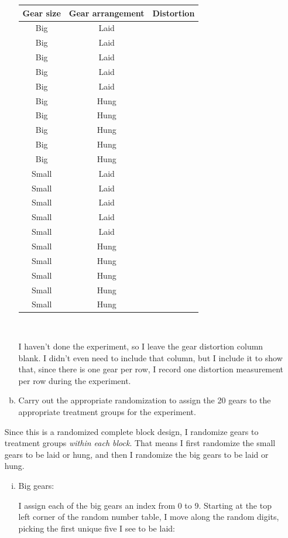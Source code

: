 \documentclass{article}\usepackage{graphicx, color}
\providecommand{\q}{$\quad$ \newline}
\numberwithin{equation}{section}
\begin{document}
\begin{flushleft}
\begin{enumerate}[1. ]
\begin{enumerate}[a. ]
\begin{tabular}{ccc}
Gear size & Gear arrangement & Distortion  \\ \hline
Big & Laid &  \\ 
Big & Laid &  \\ 
Big & Laid &  \\ 
Big & Laid &  \\ 
Big & Laid &  \\ 
Big & Hung &  \\ 
Big & Hung &  \\ 
Big & Hung &  \\ 
Big & Hung &  \\ 
Big & Hung &  \\ 
Small & Laid & \\
Small & Laid & \\
Small & Laid & \\
Small & Laid & \\
Small & Laid & \\
Small & Hung & \\
Small & Hung & \\
Small & Hung & \\
Small & Hung & \\
Small & Hung & \\
\end{tabular} \q

I haven't done the experiment, so I leave the gear distortion column blank. I didn't even need to include that column, but I include it to show that, since there is one gear per row, I record one distortion measurement per row during the experiment.

\color{black}




\item Carry out the appropriate randomization to assign the 20 gears to the appropriate treatment groups for the experiment.
\end{enumerate}


\color{red}

Since this is a randomized complete block design, I randomize gears to treatment groups \emph{within each block}. That means I first randomize the small gears to be laid or hung, and then I randomize the big gears to be laid or hung.

\begin{enumerate}[i. ]
\item Big gears: \q

I assign each of the big gears an index from 0 to 9. Starting at the top left corner of the random number table, I move along the random digits, picking the first unique five I see to be laid: \q


\end{enumerate}
\end{enumerate}
\end{flushleft}
\end{document}
